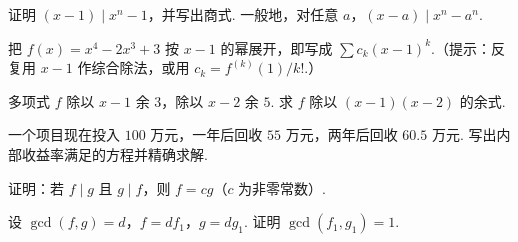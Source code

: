{\begin{exA}
			\item\label{ex:poly:A16} 证明 $(x-1)\mid x^n-1$，并写出商式. 一般地，对任意 $a$，$(x-a)\mid x^n-a^n$.
			\item\label{ex:poly:A17} 把 $f(x)=x^4-2x^3+3$ 按 $x-1$ 的幂展开，即写成 $\sum c_k(x-1)^k$.（提示：反复用 $x-1$ 作综合除法，或用 $c_k=f^{(k)}(1)/k!$.）
			\item\label{ex:poly:A18} 多项式 $f$ 除以 $x-1$ 余 $3$，除以 $x-2$ 余 $5$. 求 $f$ 除以 $(x-1)(x-2)$ 的余式.
			\item\label{ex:poly:A19} 一个项目现在投入 $100$ 万元，一年后回收 $55$ 万元，两年后回收 $60.5$ 万元. 写出内部收益率满足的方程并精确求解.
			\item\label{ex:poly:A20} 证明：若 $f\mid g$ 且 $g\mid f$，则 $f=cg$（$c$ 为非零常数）.
			\item\label{ex:poly:A21} 设 $\gcd(f,g)=d$，$f=df_1$，$g=dg_1$. 证明 $\gcd(f_1,g_1)=1$.
		\end{exA}
		
}
